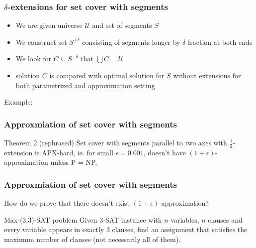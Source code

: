 \documentclass{beamer}
\begin{document}
\begin{frame}
\frametitle{$\delta$-extensions for set cover with segments}
\begin{itemize}
\item We are given universe $\mathcal{U}$ and set of segments $S$
\item We construct set $S^{+\delta}$ consisting of  
segments longer by $\delta$ fraction at both ends
\item We look for $C \subseteq S^{+\delta}$ that $\bigcup C = \mathcal{U}$
\item solution $C$ is compared with optimal solution for $S$ without extensions
for both parametrized and approximation setting
\end{itemize}

Example:


\end{frame}


\begin{frame}
\frametitle{Approxmiation of set cover with segments}
\begin{block}{Theorem 2 (rephrased)}
	Set cover with segments parallel to two axes with $\frac{1}{2}$-extension
	is APX-hard, ie.\newline
	for small $\epsilon =0.001$,
	doesn't have $(1+\epsilon)$-approximation unless P = NP.
\end{block}

\end{frame}


\begin{frame}
\frametitle{Approxmiation of set cover with segments}
How do we prove that there doesn't exist $(1+\epsilon)$-approximation?

\begin{block}{Max-(3,3)-SAT problem}
Given 3-SAT instance with $n$ variables, $n$ clauses
and every variable appears in exactly 3 clauses,
find an assignment
that satisfies the maximum number of clauses
(not necessarily all of them).
\end{block}

\end{frame}
\end{document}
